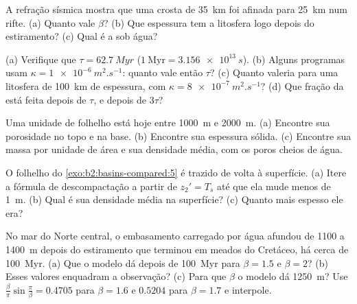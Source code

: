 \begin{exercise}[$\star$]\label{exo:b2:basins-compared:3}
A refração sísmica mostra que uma crosta de \qty{35}{km} foi afinada para \qty{25}{km} num rifte.
(a) Quanto vale $\beta$? (b) Que espessura tem a litosfera logo depois do estiramento? (c) Qual é a
 sob água?
\end{exercise}

\begin{exercise}[$\star$]\label{exo:b2:basins-compared:4}
(a) Verifique que $\tau = \qty{62.7}{Myr}$ ($1~\text{Myr} = \qty{3.156e13}{s}$). (b) Alguns programas
usam $\kappa = \qty{1e-6}{m^2.s^{-1}}$: quanto vale então $\tau$? (c) Quanto valeria para uma
litosfera de \qty{100}{km} de espessura, com $\kappa = \qty{8e-7}{m^2.s^{-1}}$? (d) Que fração da
 está feita depois de $\tau$, e depois de $3\tau$?
\end{exercise}

\begin{exercise}[$\star\star$]\label{exo:b2:basins-compared:5}
Uma unidade de folhelho está hoje entre \qty{1000}{m} e \qty{2000}{m}. (a) Encontre sua porosidade no
topo e na base. (b) Encontre sua espessura sólida. (c) Encontre sua massa por unidade de área e sua densidade
média, com os poros cheios de água.
\end{exercise}

\begin{exercise}[$\star\star$]\label{exo:b2:basins-compared:6}
O folhelho do \cref{exo:b2:basins-compared:5} é trazido de volta à superfície. (a) Itere a
fórmula de descompactação a partir de $z_2' = T_s$ até que ela mude menos de \qty{1}{m}. (b) Qual é
sua densidade média na superfície? (c) Quanto mais espesso ele era?
\end{exercise}

\begin{exercise}[$\star\star$]\label{exo:b2:basins-compared:7}
No mar do Norte central, o embasamento carregado por água afundou de 1100 a \qty{1400}{m} depois do
estiramento que terminou em meados do Cretáceo, há cerca de \qty{100}{Myr}. (a) Que  o modelo dá depois de \qty{100}{Myr} para $\beta = 1.5$ e $\beta = 2$? (b) Esses
valores enquadram a observação? (c) Para que $\beta$ o modelo dá \qty{1250}{m}?
Use $\frac{\beta}{\pi}\sin\frac{\pi}{\beta} = 0.4705$ para $\beta = 1.6$ e $0.5204$ para $\beta
= 1.7$ e interpole.
\end{exercise}

